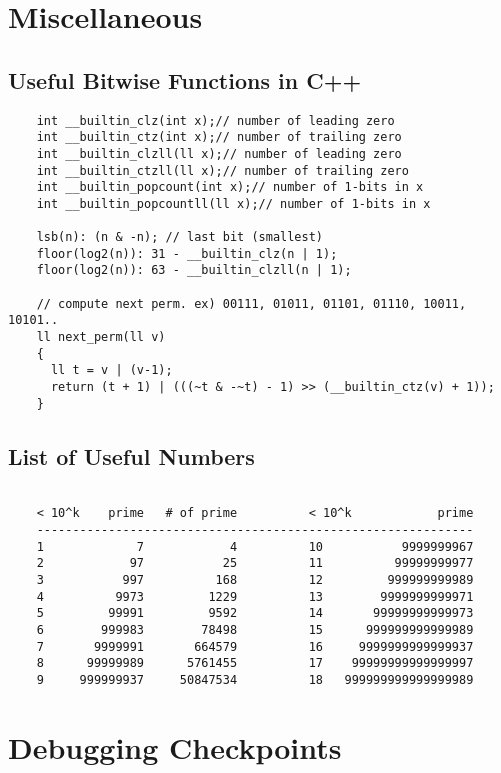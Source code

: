 \documentclass[landscape,8pt]{article}
\begin{document}
\begin{multicols}{2}
\section{Miscellaneous}
  \subsection{Useful Bitwise Functions in C++}
  \begin{verbatim}
    int __builtin_clz(int x);// number of leading zero
    int __builtin_ctz(int x);// number of trailing zero
    int __builtin_clzll(ll x);// number of leading zero
    int __builtin_ctzll(ll x);// number of trailing zero
    int __builtin_popcount(int x);// number of 1-bits in x
    int __builtin_popcountll(ll x);// number of 1-bits in x

    lsb(n): (n & -n); // last bit (smallest)
    floor(log2(n)): 31 - __builtin_clz(n | 1);
    floor(log2(n)): 63 - __builtin_clzll(n | 1);

    // compute next perm. ex) 00111, 01011, 01101, 01110, 10011, 10101..
    ll next_perm(ll v)
    {
      ll t = v | (v-1);
      return (t + 1) | (((~t & -~t) - 1) >> (__builtin_ctz(v) + 1));
    }
  \end{verbatim}
  \columnbreak
  \subsection{List of Useful Numbers}
  \begin{verbatim}

    < 10^k    prime   # of prime          < 10^k            prime
    -------------------------------------------------------------
    1             7            4          10           9999999967
    2            97           25          11          99999999977
    3           997          168          12         999999999989
    4          9973         1229          13        9999999999971
    5         99991         9592          14       99999999999973
    6        999983        78498          15      999999999999989
    7       9999991       664579          16     9999999999999937
    8      99999989      5761455          17    99999999999999997
    9     999999937     50847534          18   999999999999999989
  \end{verbatim}
\columnbreak
\section{Debugging Checkpoints}
\end{multicols}
\end{document}
